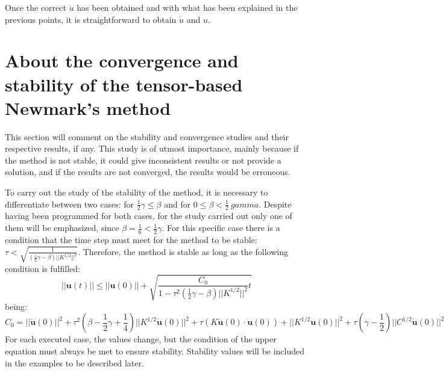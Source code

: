 \documentclass[a4paper, 10pt]{article}
\begin{document}
Once the correct $\ddot{u}$ has been obtained and with what has been explained in the previous points, it is straightforward to obtain $\dot{u}$ and $u$.







\section{About the convergence and stability of the tensor-based Newmark's method}

This section will comment on the stability and convergence studies and their respective results, if any. This study is of utmost importance, mainly because if the method is not stable, it could give inconsistent results or not provide a solution, and if the results are not converged, the results would be erroneous.


To carry out the study of the stability of the method, it is necessary to differentiate between two cases: for $\frac{1}{2} \gamma \leq \beta$ and for $0 \leq \beta < \frac{1}{2} \ gamma$. Despite having been programmed for both cases, for the study carried out only one of them will be emphasized, since $\beta = \frac{1}{6} < \frac{1}{2} \gamma$.
For this specific case there is a condition that the time step must meet for the method to be stable: $\tau < \sqrt{\frac{1}{(\frac{1}{2} \gamma - \beta) || K^{1/2}||^2}} $.
Therefore, the method is stable as long as the following condition  is fulfilled:
\begin{equation}
    ||\mathbf{u}(t)|| \leq ||\mathbf{u}(0)|| + \sqrt{\frac{C_0}{1-\tau^2 (\frac{1}{2} \gamma - \beta) ||K^{1/2}||^2}t}
\end{equation}
being:
\begin{equation}
    C_0 = ||\dot{\mathbf{u}}(0)||^2 + \tau^2 (\beta - \frac{1}{2} \gamma + \frac{1}{4}) ||K^{1/2} \dot{\mathbf{u}}(0) ||^2 + \tau (K \dot{\mathbf{u}}(0) \cdot \mathbf{u}(0)) + || K^{1/2} \mathbf{u}(0) ||^2 + \tau (\gamma - \frac{1}{2}) || C^{1/2} \dot{\mathbf{u}}(0) ||^2
\end{equation}
For each executed case, the values change, but the condition of the upper equation must always be met to ensure stability. Stability values will be included in the examples to be described later.\\
\end{document}
